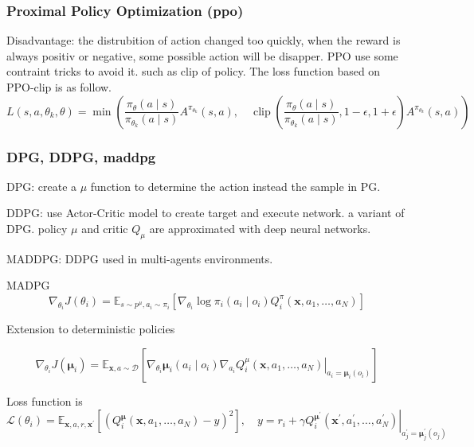 \subsubsection{Proximal Policy Optimization (\gls{ppo})}
Disadvantage: the distrubition of action changed too quickly, when the reward is always positiv or negative, some possible action will be disapper.
PPO use some contraint tricks to avoid it. such as clip of policy. The loss function based on PPO-clip is as follow.
\begin{equation}
L\left(s, a, \theta_{k}, \theta\right)=\min \left(\frac{\pi_{\theta}(a \mid s)}{\pi_{\theta_{k}}(a \mid s)} A^{\pi_{\theta_{k}}}(s, a), \quad \operatorname{clip}\left(\frac{\pi_{\theta}(a \mid s)}{\pi_{\theta_{k}}(a \mid s)}, 1-\epsilon, 1+\epsilon\right) A^{\pi_{\theta_{k}}}(s, a)\right)
\end{equation} 

\subsubsection{DPG, DDPG, \gls{maddpg}} \label{background:maddpg}

DPG: create a $\mu$ function to determine the action instead the sample in PG.

DDPG: use Actor-Critic model to create target and execute network. a variant of DPG. policy $\mu$ and critic $Q_\mu$ are approximated with deep neural networks.

MADDPG: DDPG used in multi-agents environments.

MADPG
\begin{equation}
\nabla_{\theta_{i}} J\left(\theta_{i}\right)=\mathbb{E}_{s \sim p^{\mu}, a_{i} \sim \pi_{i}}\left[\nabla_{\theta_{i}} \log \pi_{i}\left(a_{i} \mid o_{i}\right) Q_{i}^{\pi}\left(\mathbf{x}, a_{1}, \ldots, a_{N}\right)\right]
\end{equation}

Extension to deterministic policies

\begin{equation}
\nabla_{\theta_{i}} J\left(\boldsymbol{\mu}_{i}\right)=\mathbb{E}_{\mathbf{x}, a \sim \mathcal{D}}\left[\left.\nabla_{\theta_{i}} \boldsymbol{\mu}_{i}\left(a_{i} \mid o_{i}\right) \nabla_{a_{i}} Q_{i}^{\mu}\left(\mathbf{x}, a_{1}, \ldots, a_{N}\right)\right|_{a_{i}=\boldsymbol{\mu}_{i}\left(o_{i}\right)}\right]
\end{equation}

Loss function is 
\begin{equation}
\mathcal{L}\left(\theta_{i}\right)=\mathbb{E}_{\mathbf{x}, a, r, \mathbf{x}^{\prime}}\left[\left(Q_{i}^{\boldsymbol{\mu}}\left(\mathbf{x}, a_{1}, \ldots, a_{N}\right)-y\right)^{2}\right], \quad y=r_{i}+\left.\gamma Q_{i}^{\boldsymbol{\mu}^{\prime}}\left(\mathbf{x}^{\prime}, a_{1}^{\prime}, \ldots, a_{N}^{\prime}\right)\right|_{a_{j}^{\prime}=\boldsymbol{\mu}_{j}^{\prime}\left(o_{j}\right)}
\end{equation}

